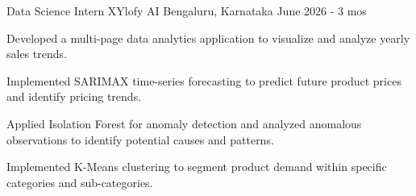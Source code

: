 
\begin{cventries}
  \cventry
    {Data Science Intern} %
    {XYlofy AI} %
    {Bengaluru, Karnataka} %
    {June 2026 - 3 mos} %
    {
      \begin{cvitems} %
        \item {Developed a multi-page data analytics application to visualize and analyze yearly sales trends.}
        \item {Implemented SARIMAX time-series forecasting to predict future product prices and identify pricing trends.}
        \item {Applied Isolation Forest for anomaly detection and analyzed anomalous observations to identify potential causes and patterns.}
        \item {Implemented K-Means clustering to segment product demand within specific categories and sub-categories.}
      \end{cvitems}
    } 
\end{cventries}

